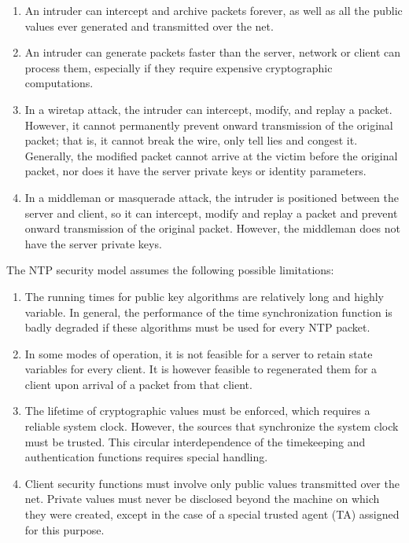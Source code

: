 \begin{enumerate}

  \item An intruder can intercept and archive packets forever, as well as
    all the public values ever generated and transmitted over the
    net.

  \item An intruder can generate packets faster than the server, network
    or client can process them, especially if they require expensive
    cryptographic computations.

  \item In a wiretap attack, the intruder can intercept, modify, and
    replay a packet.  However, it cannot permanently prevent onward
    transmission of the original packet; that is, it cannot break the
    wire, only tell lies and congest it.  Generally, the modified
    packet cannot arrive at the victim before the original packet,
    nor does it have the server private keys or identity parameters.

  \item In a middleman or masquerade attack, the intruder is positioned
    between the server and client, so it can intercept, modify and
    replay a packet and prevent onward transmission of the original
    packet.  However, the middleman does not have the server private
    keys.

\end{enumerate}

The NTP security model assumes the following possible limitations:

\begin{enumerate}

  \item The running times for public key algorithms are relatively long
    and highly variable.  In general, the performance of the time
    synchronization function is badly degraded if these algorithms
    must be used for every NTP packet.

  \item In some modes of operation, it is not feasible for a server to
    retain state variables for every client.  It is however feasible
    to regenerated them for a client upon arrival of a packet from
    that client.

  \item The lifetime of cryptographic values must be enforced, which
    requires a reliable system clock.  However, the sources that
    synchronize the system clock must be trusted.  This circular
    interdependence of the timekeeping and authentication functions
    requires special handling.

  \item Client security functions must involve only public values
    transmitted over the net.  Private values must never be disclosed
    beyond the machine on which they were created, except in the case
    of a special trusted agent (TA) assigned for this purpose.

\end{enumerate}

